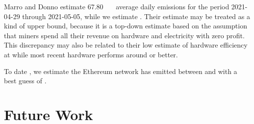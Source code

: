 Marro and Donno estimate \SI{67.80}{\kilo\ton\COtwoe} average daily emissions for the period 2021-04-29 through 2021-05-05, while we estimate . Their estimate may be treated as a kind of upper bound, because it is a top-down estimate based on the assumption that miners spend all their revenue on hardware and electricity with zero profit. This discrepancy may also be related to their low estimate of hardware efficiency at  while most recent hardware performs around  or better.

To date {\todaterange}, we estimate the Ethereum network has emitted between  and  with a best guess of .

\section{Future Work}

